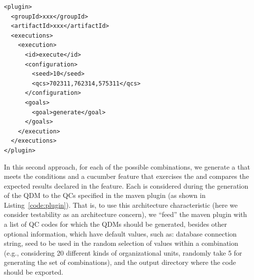 \begin{lstlisting}[frame=single, language=Plugin, caption={\it Maven plugin for test generation}, label={code:plugin}]
<plugin>
  <groupId>xxx</groupId>
  <artifactId>xxx</artifactId>
  <executions>
    <execution>
      <id>execute</id>			
      <configuration>
        <seed>10</seed>				
        <qcs>702311,762314,575311</qcs>				
      </configuration>
      <goals>
        <goal>generate</goal>
      </goals>
    </execution>
  </executions>
</plugin>	
\end{lstlisting}

In this second approach, for each of the possible combinations, we generate a \shc that meets the conditions 
and a cucumber feature that exercises the \shc and compares the expected results declared in the feature. 
Each \shc is considered during the generation of the QDM to the QCs specified in the 
maven plugin (as shown in Listing~\ref{code:plugin}).
That is, to use this architecture characteristic (here we consider testability as an 
architecture concern), we ``feed'' the maven plugin with a list of QC codes for which the QDMs should be generated, 
besides other optional information, which have default values, such as: database connection string,
seed to be used in the random selection of values within a combination (e.g., considering 20 different
kinds of organizational units, randomly take 5 for generating the set of combinations), and the output directory 
where the code should be exported. 

